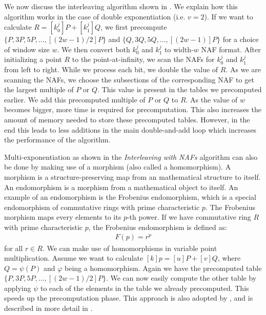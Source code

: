 We now discuss the interleaving algorithm shown in .
We explain how this algorithm works in the case of double exponentiation (i.e. $v = 2$).
If we want to calculate $R = [k_0^j]P + [k_1^j] Q$, we first precompute $\{P, 3P, 5P, \ldots, [(2w - 1) / 2]P \}$ and $\{ Q, 3Q, 5Q, \ldots, [(2w - 1)] P \}$ for a choice of window size $w$. 
We then convert both $k_0^j$ and $k_1^j$ to width-$w$ NAF format. 
After initializing a point $R$ to the point-at-infinity, we scan the NAFs for $k_0^j$ and $k_1^j$ from left to right. 
While we process each bit, we double the value of $R$. 
As we are scanning the NAFs, we choose the subsections of the corresponding NAF to get the largest multiple of $P$ or $Q$.
This value is present in the tables we precomputed earlier.
We add this precomputed multiple of $P$ or $Q$ to $R$.
As the value of $w$ becomes bigger, more time is required for precomputation.
This also increases the amount of memory needed to store these precomputed tables. 
However, in the end this leads to less additions in the main double-and-add loop which increases the performance of the algorithm.

Multi-exponentiation as shown in the \emph{Interleaving with NAFs} algorithm can also be done by making use of a morphism (also called a homomorphism).
A morphism is a structure-preserving map from an mathematical structure to itself.
An endomorphism is a morphism from a mathematical object to itself.
An example of an endomorphism is the Frobenius endomorphism, which is a special endomorphism of commutative rings with prime characteristic $p$.
The Frobenius morphism maps every elements to its $p$-th power.
If we have commutative ring $R$ with prime characteristic $p$, the Frobenius endomorphism is defined as:
%
\begin{align*}
F(p) = r^p
\end{align*}
%
for all $r \in R$.
We can make use of homomorphisms in variable point multiplication.
Assume we want to calculate $[k]p = [u]P + [v]Q$, where $Q = \psi(P)$ and $\varphi$ being a homomorphism.
Again we have the precomputed table $\{P, 3P, 5P, \ldots, [(2w - 1) / 2]P \}$.
We can now easily compute the other table by applying $\psi$ to each of the elements in the table we already precomputed.
This speeds up the precomputation phase.
This approach is also adopted by {\fourq}, and is described in more detail in .
